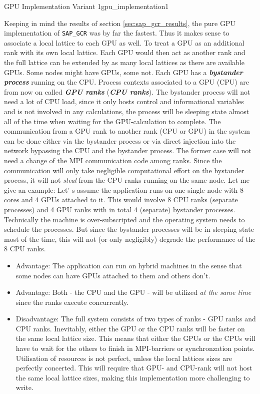 \documentclass{article}
\theoremstyle{plain} %
\theoremstyle{convention} %
\theoremstyle{remark} %
\def\code#1{\texttt{#1}}
\def\df#1{\textbf{\textit{#1}}}
\numberwithin{equation}{section}
\begin{document}
\begin{proposal}{GPU Implementation Variant 1}{gpu_implementation1} %

Keeping in mind the results of section \ref{sec:sap_gcr_results}, the pure GPU implementation of \code{SAP\_GCR} was by far the fastest. Thus it makes sense to associate a local lattice to each GPU as well. To treat a GPU as an additional rank with its own local lattice. Each GPU would then act as another rank and the full lattice can be extended by as many local lattices as there are available GPUs. Some nodes might have GPUs, some not. Each GPU has a \df{bystander process} running on the CPU. Process contexts associated to a GPU (CPU) are from now on called \df{GPU ranks} (\df{CPU ranks}). The bystander process will not need a lot of CPU load, since it only hosts control and informational variables and is not involved in any calculations, the process will be sleeping state almost all of the time when waiting for the GPU-calculation to complete. The communication from a GPU rank to another rank (CPU or GPU) in the system can be done either via the bystander process or via direct injection into the network bypassing the CPU and the bystander process. The former case will not need a change of the MPI communication code among ranks. Since the communication will only take negligible computational effort on the bystander process, it will not \textit{steal} from the CPU ranks running on the same node. Let me give an example: Let' s assume the application runs on one single node with \num{8} cores and \num{4} GPUs attached to it. This would involve \num{8} CPU ranks (separate processes) and \num{4} GPU ranks with in total \num{4} (separate) bystander processes. Technically the machine is over-subscripted and the operating system needs to schedule the processes. But since the bystander processes will be in sleeping state most of the time, this will not (or only negligibly) degrade the performance of the \num{8} CPU ranks.

\begin{itemize}
    \item Advantage: The application can run on hybrid machines in the sense that some nodes can have GPUs attached to them and others don't.
    \item Advantage: Both - the CPU and the GPU - will be utilized \textit{at the same time} since the ranks execute concurrently.
    \item Disadvantage: The full system consists of two types of ranks - GPU ranks and CPU ranks. Inevitably, either the GPU or the CPU ranks will be faster on the same local lattice size. This means that either the GPUs or the CPUs will have to wait for the others to finish in MPI-barriers or synchronzation points. Utilisation of resources is not perfect, unless the local lattices sizes are perfectly concerted. This will require that GPU- and CPU-rank will not host the same local lattice sizes, making this implementation more challenging to write.
\end{itemize}

\end{proposal}
\end{document}
